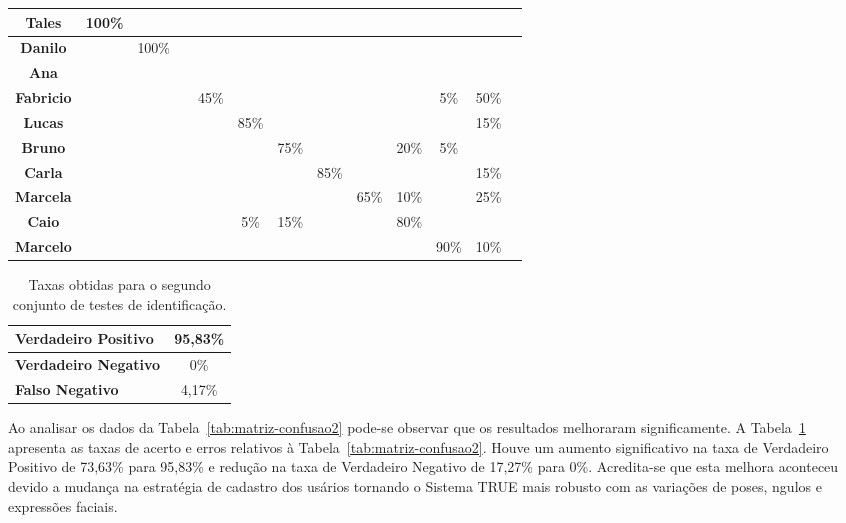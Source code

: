 \begin{table}[htb]
\begin{center}
\begin{tabular}{|c|c|c|c|c|c|c|c|c|c|c|c|c|}
				\hline \bf Tales 			&100\% & 			& 		 & 			&   	 & 			& 		& 		&	 		& 		& 		\\
				\hline \bf Danilo 		& 		 &100\%	& 		 & 			&   	 & 			& 		& 		& 		& 		& 		 		\\
				\hline \bf Ana 				& 		 & 			& 		 & 			&   	 & 			& 		& 		& 		& 		& 		    \\
				\hline \bf Fabricio 	& 		 & 			& 		 &45\%	&      & 			& 		& 		& 		& 5\%	& 50\%    		\\
				\hline \bf Lucas 			& 		 & 			& 		 & 			& 85\% & 			& 		& 		& 		& 		& 15\%		\\
				\hline \bf Bruno 			& 		 & 			& 		 & 			& 		 & 75\% & 	  & 		&20\% & 5\%	& 		  	\\
				\hline \bf Carla 			& 		 & 			& 		 & 			& 		 & 			&85\% &		  & 	  & 		& 15\%		  	\\
				\hline \bf Marcela 		& 		 & 			& 		 & 			& 		 &      & 		&65\% &10\% & 		& 25\%		  	\\
				\hline \bf Caio 		  & 		 & 			& 		 & 			& 	5\%& 	15\%& 		& 		&80\%	&	 		& 		  	\\
				\hline \bf Marcelo 		& 		 & 			& 		 & 			& 		 & 			& 		& 		& 		& 90\%& 10\%		  	\\
				\hline
			\end{tabular}
		\end{center}
	\end{table}

	\begin{table}[htb]
		\begin{center}
			\caption{Taxas obtidas para o segundo conjunto de testes de identificação.}
			\label{tab:taxas2}
			\begin{tabular}{|l|c|}
				\hline \bf Verdadeiro Positivo & 95,83\% \\
				\hline \bf Verdadeiro Negativo & 0\% \\
				\hline \bf Falso Negativo & 4,17\% \\
				\hline
			\end{tabular}
		\end{center}
	\end{table}

	Ao analisar os dados da Tabela~\ref{tab:matriz-confusao2} pode-se observar que os resultados melhoraram significamente. A Tabela~\ref{tab:taxas2} apresenta as taxas de acerto e erros relativos à Tabela~\ref{tab:matriz-confusao2}. Houve um aumento significativo na taxa de Verdadeiro Positivo de 73,63\% para 95,83\% e redução na taxa de Verdadeiro Negativo de 17,27\% para 0\%. Acredita-se que esta melhora aconteceu devido a mudança na estratégia de cadastro dos usários tornando o Sistema TRUE mais robusto com as variações de poses, ngulos e expressões faciais.


